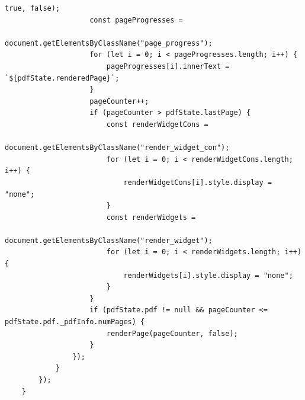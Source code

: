 \begin{lstlisting}[style=ES6, caption={Renderfunktion}, label=code:render]
						true, false);
					const pageProgresses = 
						document.getElementsByClassName("page_progress");
					for (let i = 0; i < pageProgresses.length; i++) {
						pageProgresses[i].innerText = `${pdfState.renderedPage}`;
					}
					pageCounter++;
					if (pageCounter > pdfState.lastPage) {
						const renderWidgetCons = 
							document.getElementsByClassName("render_widget_con");
						for (let i = 0; i < renderWidgetCons.length; i++) {
							renderWidgetCons[i].style.display = "none";
						}
						const renderWidgets = 
							document.getElementsByClassName("render_widget");
						for (let i = 0; i < renderWidgets.length; i++) {
							renderWidgets[i].style.display = "none";
						}
					} 
					if (pdfState.pdf != null && pageCounter <= pdfState.pdf._pdfInfo.numPages) {
						renderPage(pageCounter, false);
					}
				});
			}
		});
	}
\end{lstlisting} 